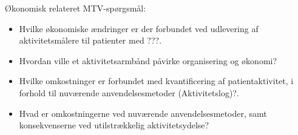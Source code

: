 

\noindent
Økonomisk relateret MTV-spørgsmål:  
\begin{itemize}
\item Hvilke økonomiske ændringer er der forbundet ved udlevering af aktivitetsmålere til patienter med ???.

\item Hvordan ville et aktivitetsarmbånd påvirke organisering og økonomi?

\item Hvilke omkostninger er forbundet med kvantificering af patientaktivitet, i forhold til nuværende anvendelsesmetoder (Aktivitetslog)?.  

\item Hvad er omkostningerne ved nuværende anvendelsesmetoder, samt konsekvenserne ved utilstrækkelig aktivitetsydelse? 
\end{itemize}
 




